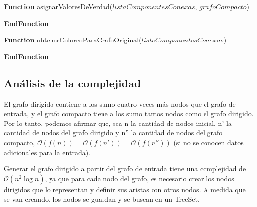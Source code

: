 \vspace{5mm}

\noindent \textbf{Function} {asignarValoresDeVerdad($listaComponentesConexas$, $grafoCompacto$)}
\begin{algorithmic}
			\ENDIF
			\ENDIF
		\ENDIF
	\ENDFOR
\end{algorithmic}
\textbf{EndFunction}

\vspace{5mm}

\noindent \textbf{Function} {obtenerColoreoParaGrafoOriginal($listaComponentesConexas$)}
\begin{algorithmic}
		\ENDFOR
	\ENDFOR
\end{algorithmic}
\textbf{EndFunction}

\subsection{Análisis de la complejidad}
El grafo dirigido contiene a los sumo cuatro veces más nodos que el grafo de entrada, y el grafo compacto tiene a los sumo tantos nodos como el grafo dirigido. Por lo tanto, podemos afirmar que, sea n la cantidad de nodos inicial, n' la cantidad de nodos del grafo dirigido y n'' la cantidad de nodos del grafo compacto, $\mathcal{O}(f(n)) = \mathcal{O}(f(n')) = \mathcal{O}(f(n''))$ (si no se conocen datos adicionales para la entrada).

Generar el grafo dirigido a partir del grafo de entrada tiene una complejidad de $\mathcal{O}(n^2\log{n})$, ya que para cada nodo del grafo, es necesario crear los nodos dirigidos que lo representan y definir sus aristas con otros nodos. A medida que se van creando, los nodos se guardan y se buscan en un TreeSet.

